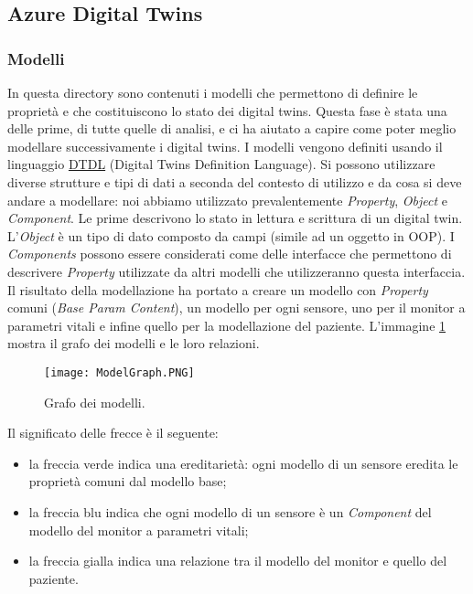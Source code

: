 \subsection{Azure Digital Twins}

\subsubsection{Modelli}
In questa directory sono contenuti i modelli che permettono di definire le proprietà e che costituiscono lo stato dei digital twins. Questa fase è stata una delle prime, di tutte quelle di analisi, e ci ha aiutato a capire come poter meglio modellare successivamente i digital twins. \newline \newline I modelli vengono definiti usando il linguaggio \href{https://github.com/Azure/opendigitaltwins-dtdl/blob/master/DTDL/v2/dtdlv2.md}{DTDL} (Digital Twins Definition Language). Si possono utilizzare diverse strutture e tipi di dati a seconda del contesto di utilizzo e da cosa si deve andare a modellare: noi abbiamo utilizzato prevalentemente \textit{Property}, \textit{Object} e \textit{Component}. Le prime descrivono lo stato in lettura e scrittura di un digital twin. L'\textit{Object} è un tipo di dato composto da campi (simile ad un oggetto in OOP). I \textit{Components} possono essere considerati come delle interfacce che permettono di descrivere \textit{Property} utilizzate da altri modelli che utilizzeranno questa interfaccia. Il risultato della modellazione ha portato a creare un modello con \textit{Property} comuni (\textit{Base Param Content}), un modello per ogni sensore, uno per il monitor a parametri vitali e infine quello per la modellazione del paziente.  L'immagine \ref{pic:model-graph} mostra il grafo dei modelli e le loro relazioni. \newline \newline \newline \begin{figure}[ht]
    \texttt{[image: ModelGraph.PNG]}
    \centering
    \caption{\label{pic:model-graph}Grafo dei modelli.}
\end{figure}
Il significato delle frecce è il seguente:
\begin{itemize}
    \item la freccia verde indica una ereditarietà: ogni modello di un sensore eredita le proprietà comuni dal modello base;
    
    \item la freccia blu indica che ogni modello di un sensore è un \textit{Component} del modello del monitor a parametri vitali;
    
    \item la freccia gialla indica una relazione tra il modello del monitor e quello del paziente.
\end{itemize}

